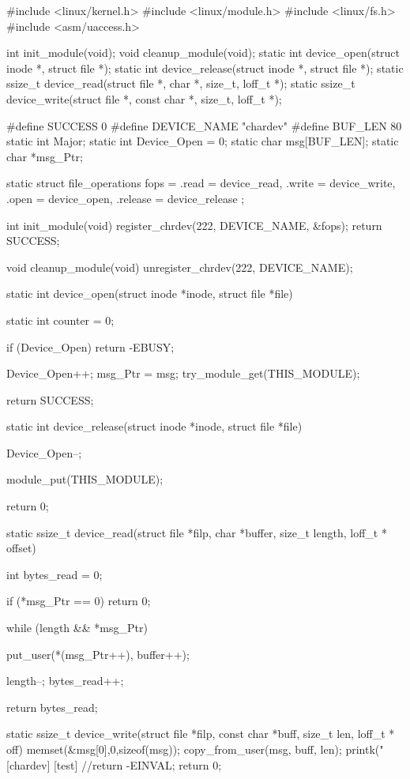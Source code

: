 \documentclass[11pt]{report}
\begin{document}
\begin{consolelong}
#include <linux/kernel.h>
#include <linux/module.h>
#include <linux/fs.h>
#include <asm/uaccess.h>

int init_module(void);
void cleanup_module(void);
static int device_open(struct inode *, struct file *);
static int device_release(struct inode *, struct file *);
static ssize_t device_read(struct file *, char *, size_t, loff_t *);
static ssize_t device_write(struct file *, const char *, size_t, loff_t *);

#define SUCCESS 0
#define DEVICE_NAME "chardev"
#define BUF_LEN 80
static int Major;    
static int Device_Open = 0;
static char msg[BUF_LEN];
static char *msg_Ptr;

static struct file_operations fops = {
    .read = device_read,
    .write = device_write,
    .open = device_open,
    .release = device_release
};

int init_module(void)
{
    register_chrdev(222, DEVICE_NAME, &fops);
    return SUCCESS;
}

void cleanup_module(void)
{
    unregister_chrdev(222, DEVICE_NAME);
}

static int device_open(struct inode *inode, struct file *file)
{
    static int counter = 0;

    if (Device_Open)
        return -EBUSY;

    Device_Open++;
    msg_Ptr = msg;
    try_module_get(THIS_MODULE);

    return SUCCESS;
}

static int device_release(struct inode *inode, struct file *file)
{
    Device_Open--;        

    module_put(THIS_MODULE);

    return 0;
}

static ssize_t device_read(struct file *filp,  
               char *buffer,
               size_t length,    
               loff_t * offset)
{
    int bytes_read = 0;

    if (*msg_Ptr == 0)
        return 0;

    while (length && *msg_Ptr) {

        put_user(*(msg_Ptr++), buffer++);

        length--;
        bytes_read++;
    }

    return bytes_read;
}

static ssize_t
device_write(struct file *filp, const char *buff, size_t len, loff_t * off)
{
    memset(&msg[0],0,sizeof(msg));
    copy_from_user(msg, buff, len);
    printk("[chardev] [test] %
    //return -EINVAL;
    return 0;
}
\end{consolelong}
\end{document}
